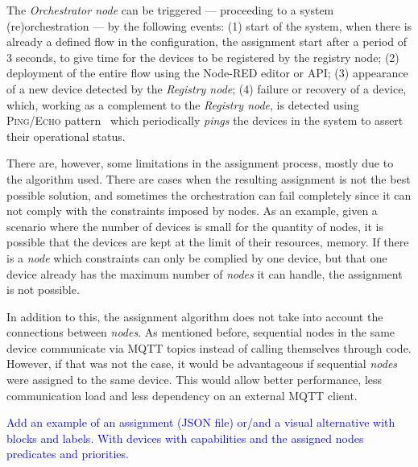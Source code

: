 
The \textit{Orchestrator node} can be triggered --- proceeding to a system (re)orchestration --- by the following events: (1) start of the system, when there is already a defined flow in the configuration, the assignment start after a period of 3 seconds, to give time for the devices to be registered by the registry node; (2) deployment of the entire flow using the Node-RED editor or API; (3) appearance of a new device detected by the \textit{Registry node}; (4) failure or recovery of a device, which, working as a complement to the \textit{Registry node}, is detected using \textsc{Ping/Echo} pattern~\cite{Scott2009} which periodically \textit{pings} the devices in the system to assert their operational status.  


There are, however, some limitations in the assignment process, mostly due to the algorithm used. There are cases when the resulting assignment is not the best possible solution, and sometimes the orchestration can fail completely since it can not comply with the constraints imposed by nodes. As an example, given a scenario where the number of devices is small for the quantity of nodes, it is possible that the devices are kept at the limit of their resources, \ie memory. If there is a \textit{node} which constraints can only be complied by one device, but that one device already has the maximum number of \textit{nodes} it can handle, the assignment is not possible.

In addition to this, the assignment algorithm does not take into account the connections between \textit{nodes}. As mentioned before, sequential nodes in the same device communicate via MQTT topics instead of calling themselves through code. However, if that was not the case, it would be advantageous if sequential \textit{nodes} were assigned to the same device. This would allow better performance, less communication load and less dependency on an external MQTT client.

\textcolor{blue}{Add an example of an assignment (JSON file) or/and a visual alternative with blocks and labels. With devices with capabilities and the assigned nodes predicates and priorities.}

